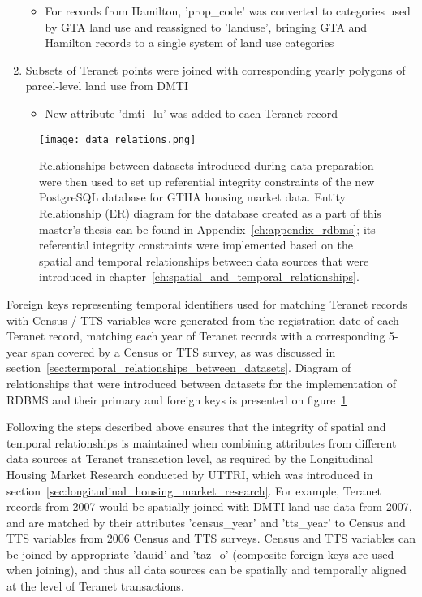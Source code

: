 \begin{enumerate}
\begin{itemize}
        \item For records from Hamilton, 'prop\_code' was converted to categories used by GTA land use and reassigned to 'landuse', bringing GTA and Hamilton records to a single system of land use categories
    \end{itemize}
    \item Subsets of Teranet points were joined with corresponding yearly polygons of parcel-level land use from DMTI
    \begin{itemize}
        \item New attribute 'dmti\_lu' was added to each Teranet record
    \end{itemize}
\end{enumerate}

\begin{figure}[hbt!]
    \centering
    \texttt{[image: data\_relations.png]}
    \caption{Relationships between datasets introduced during data preparation were then used to set up referential integrity constraints of the new PostgreSQL database for GTHA housing market data.
    Entity Relationship (ER) diagram for the database created as a part of this master's thesis can be found in Appendix~\ref{ch:appendix_rdbms};
    its referential integrity constraints were implemented based on the spatial and temporal relationships between data sources that were introduced in chapter~\ref{ch:spatial_and_temporal_relationships}.}
    \label{fig:data_relations}
\end{figure}

Foreign keys representing temporal identifiers used for matching Teranet records with Census / TTS variables were generated from the registration date of each Teranet record, matching each year of Teranet records with a corresponding 5-year span covered by a Census or TTS survey, as was discussed in section~\ref{sec:termporal_relationships_between_datasets}.
Diagram of relationships that were introduced between datasets for the implementation of RDBMS and their primary and foreign keys is presented on figure~\ref{fig:data_relations}

Following the steps described above ensures that the integrity of spatial and temporal relationships is maintained when combining attributes from different data sources at Teranet transaction level, as required by the Longitudinal Housing Market Research conducted by UTTRI, which was introduced in section~\ref{sec:longitudinal_housing_market_research}.
For example, Teranet records from 2007 would be spatially joined with DMTI land use data from 2007, and are matched by their attributes 'census\_year' and 'tts\_year' to Census and TTS variables from 2006 Census and TTS surveys.
Census and TTS variables can be joined by appropriate 'dauid' and 'taz\_o' (composite foreign keys are used when joining), and thus all data sources can be spatially and temporally aligned at the level of Teranet transactions.


